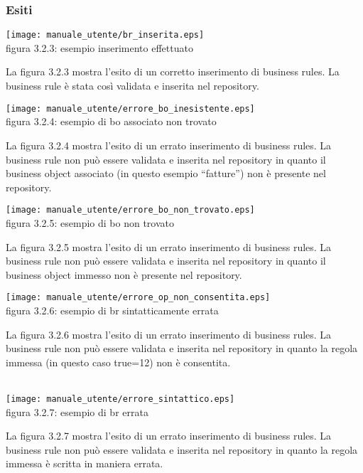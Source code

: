 \subsubsection{Esiti}
\begin{center}
\texttt{[image: manuale\_utente/br\_inserita.eps]}\\
 figura 3.2.3: esempio inserimento effettuato
\end{center} 
La figura 3.2.3 mostra l'esito di un corretto inserimento di business rules. La business rule \`e stata cos\`i validata e inserita nel repository.

\begin{center}
\texttt{[image: manuale\_utente/errore\_bo\_inesistente.eps]}\\
 figura 3.2.4: esempio di bo associato non trovato
\end{center} 
La figura 3.2.4 mostra l'esito di un errato inserimento di business rules. La business rule non pu\`o essere validata e inserita nel repository in quanto il business object associato (in questo esempio ``fatture'') non \`e presente nel repository.

\begin{center}
\texttt{[image: manuale\_utente/errore\_bo\_non\_trovato.eps]}\\
 figura 3.2.5: esempio di bo non trovato
\end{center} 
La figura 3.2.5 mostra l'esito di un errato inserimento di business rules. La business rule non pu\`o essere validata e inserita nel repository in quanto il business object immesso non \`e presente nel repository.

\begin{center}
\texttt{[image: manuale\_utente/errore\_op\_non\_consentita.eps]}\\
 figura 3.2.6: esempio di br sintatticamente errata 
\end{center} 
La figura 3.2.6 mostra l'esito di un errato inserimento di business rules. La business rule non pu\`o essere validata e inserita nel repository in quanto la regola immessa (in questo caso true=12) non \`e consentita.
\\
\\
\begin{center}
\texttt{[image: manuale\_utente/errore\_sintattico.eps]}\\
 figura 3.2.7: esempio di br errata
\end{center} 
La figura 3.2.7 mostra l'esito di un errato inserimento di business rules. La business rule non pu\`o essere validata e inserita nel repository in quanto la regola immessa \`e scritta in maniera errata.

